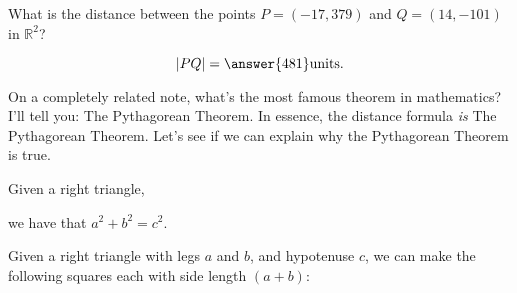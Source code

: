 \documentclass{ximera}
\begin{document}
\begin{question}
  What is the distance between the points $P=(-17,379)$ and
  $Q=(14,-101)$ in $\mathbb{R}^2$?
  \begin{prompt}
    \[
    |PQ|=\answer{481}\mathrm{units}.
    \]
  \end{prompt}
\end{question}

On a completely related note, what's the most famous theorem in
mathematics? I'll tell you: The Pythagorean Theorem. In essence, the
distance formula \textit{is} The Pythagorean Theorem. Let's see if we
can explain why the Pythagorean Theorem is true.

\begin{theorem}
  Given a right triangle,
  \begin{image}
  \end{image}
  we have that $a^2 + b^2 = c^2.$
  \begin{explanation}
    Given a right triangle with legs $a$ and $b$, and hypotenuse $c$,
    we can make the following squares each with side length $(a+b)$:
    \begin{image}
\end{image}
\end{explanation}
\end{theorem}
\end{document}
